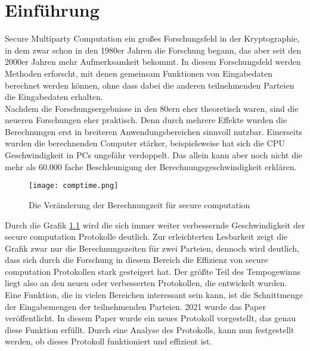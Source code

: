 \chapter{Einführung}
Secure Multiparty Computation ein großes Forschungsfeld in der Kryptographie, in dem zwar schon in den 1980er Jahren die Forschung begann, das aber seit den 2000er Jahren mehr Aufmerksamkeit bekommt. \cite{Kogan2021}
In diesem Forschungsfeld werden Methoden erforscht, mit denen gemeinsam Funktionen von Eingabedaten berechnet werden können, ohne dass dabei die anderen teilnehmenden Parteien die Eingabedaten erhalten.\\
Nachdem die Forschungsergebnisse in den 80ern eher theoretisch waren, sind die neueren Forschungen eher praktisch. Denn durch mehrere Effekte wurden die Berechnungen erst in breiteren Anwendungsbereichen sinnvoll nutzbar. Einerseits wurden die berechnenden Computer stärker, beispielsweise hat sich die CPU Geschwindigkeit in PCs ungefähr verdoppelt. Das allein kann aber noch nicht die mehr als 60.000 fache Beschleunigung der Berechnungsgeschwindigkeit erklären. \cite{Kogan2021}
\begin{figure}[h]
\begin{center}
\texttt{[image: comptime.png]}
\caption{Die Veränderung der Berechnungzeit für secure computation}
\cite{Kogan2021}
\label{evolution_of_computation}

\end{center}

\end{figure}


Durch die Grafik \ref{evolution_of_computation} wird die sich immer weiter verbessernde Geschwindigkeit der secure computation Protokolle deutlich. Zur erleichterten Lesbarkeit zeigt die Grafik zwar nur die Berechnungszeiten für zwei Parteien, dennoch wird deutlich, dass sich durch die Forschung in diesem Bereich die Effizienz von secure computation Protokollen stark gesteigert hat.
Der größte Teil des Tempogewinns liegt also an den neuen oder verbesserten Protokollen, die entwickelt wurden.\\
Eine Funktion, die in vielen Bereichen interessant sein kann, ist die Schnittmenge der Eingabemengen der teilnehmenden Parteien. 2021 wurde das Paper \cite{Doettling2021} veröffentlicht. In diesem Paper wurde ein neues Protokoll vorgestellt, das genau diese Funktion erfüllt. Durch eine Analyse des Protokolls, kann nun festgestellt werden, ob dieses Protokoll funktioniert und effizient ist.

